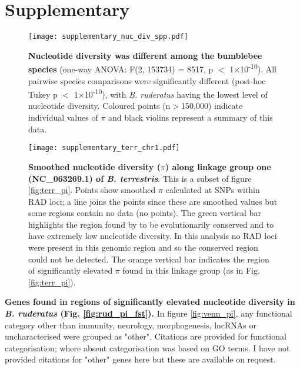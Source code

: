 
\section{Supplementary}

\setcounter{figure}{0}  %
\makeatletter  %
\renewcommand{\thefigure}{S\@arabic\c@figure}
\makeatother

\begin{figure}[ht!]
	\centering
	\texttt{[image: supplementary\_nuc\_div\_spp.pdf]}
	\captionsetup{width=0.88\linewidth}
	\caption{\textbf{Nucleotide diversity was different among the bumblebee species} (one-way ANOVA: F(2, 153734) = 8517, p $<$ 1$\times$10\textsuperscript{-10}). All pairwise species comparisons were significantly different (post-hoc Tukey p $<$ 1$\times$10\textsuperscript{-10}), with \emph{B. ruderatus} having the lowest level of nucleotide diversity. Coloured points (n$>$150,000) indicate individual values of $\pi$ and black violins represent a summary of this data.}
	\label{Sfig:nuc_div_spp}
\end{figure}

\begin{figure}[ht!]
	\centering
	\texttt{[image: supplementary\_terr\_chr1.pdf]}
	\captionsetup{width=0.88\linewidth}
	\caption{\textbf{Smoothed nucleotide diversity ($\pi$) along linkage group one (NC\_063269.1) of \emph{B. terrestris}}. This is a subset of figure \ref{fig:terr_pi}. Points show smoothed $\pi$ calculated at SNPs within RAD loci; a line joins the points since these are smoothed values but some regions contain no data (no points). The green vertical bar highlights the region found by \cite{colgan_genomic_2022} to be evolutionarily conserved and to have extremely low nucleotide diversity. In this analysis no RAD loci were present in this genomic region and so the conserved region could not be detected. The orange vertical bar indicates the region of significantly elevated $\pi$ found in this linkage group (as in Fig. \ref{fig:terr_pi}).}
	\label{Sfig:terr_chr1}
\end{figure}


\setcounter{table}{0}  %
\makeatletter  %
\renewcommand{\thetable}{S\@arabic\c@table}
\makeatother

\begin{table}[ht!]
	\centering
	\footnotesize
	\captionsetup{width=0.88\linewidth}
	\caption{\textbf{Genes found in regions of significantly elevated nucleotide diversity in \emph{B. ruderatus} (Fig. \ref{fig:rud_pi_fst}).} In figure \ref{fig:venn_pi}, any functional category other than immunity, neurology, morphogenesis, lncRNAs or uncharacterised were grouped as "other". Citations are provided for functional categorisation; where absent categorisation was based on GO terms. I have not provided citations for "other" genes here but these are available on request.}
	\label{STab:rud_genes}
\end{table}

